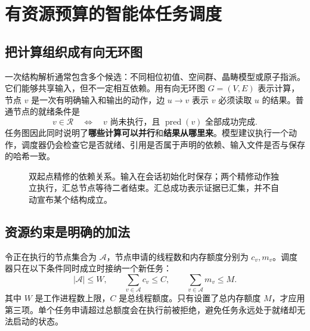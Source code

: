 \chapter{有资源预算的智能体任务调度}
\label{chap:scheduler}

\section{把计算组织成有向无环图}
一次结构解析通常包含多个候选：不同相位初值、空间群、晶畴模型或原子指派。它们能够共享输入，但不一定相互依赖。用有向无环图 $G=(V,E)$ 表示计算，节点 $v$ 是一次有明确输入和输出的动作，边 $u\to v$ 表示 $v$ 必须读取 $u$ 的结果。普通节点的就绪条件是
\begin{equation}
v\in\mathcal R\quad\Longleftrightarrow\quad
v\text{ 尚未执行，且 }\operatorname{pred}(v)\text{ 全部成功完成}.
\end{equation}
任务图因此同时说明了\textbf{哪些计算可以并行}和\textbf{结果从哪里来}。模型建议执行一个动作，调度器仍会检查它是否就绪、引用是否属于声明的依赖、输入文件是否与保存的哈希一致。

\begin{figure}[!htbp]
\centering
{}
\caption{双起点精修的依赖关系。输入在会话初始化时保存；两个精修动作独立执行，汇总节点等待二者结束。汇总成功表示证据已汇集，并不自动宣布某个结构成立。}
\end{figure}

\section{资源约束是明确的加法}
令正在执行的节点集合为 $\mathcal A$，节点申请的线程数和内存额度分别为 $c_v,m_v$。调度器只在以下条件同时成立时接纳一个新任务：
\begin{equation}
|\mathcal A|\le W,\qquad
\sum_{v\in\mathcal A}c_v\le C,\qquad
\sum_{v\in\mathcal A}m_v\le M.
\label{eq:resource-admission}
\end{equation}
其中 $W$ 是工作进程数上限，$C$ 是总线程额度。只有设置了总内存额度 $M$，才应用第三项。单个任务申请超过总额度会在执行前被拒绝，避免任务永远处于就绪却无法启动的状态。

